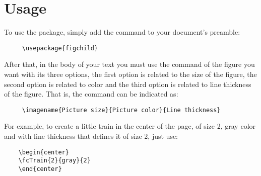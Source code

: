 \documentclass{article}
\begin{document}

\section{Usage}

\hspace{\parindent}To use the package, simply add the command to your document's preamble:

\begin{verbatim}
     \usepackage{figchild}
\end{verbatim}

After that, in the body of your text you must use the command of the figure you want with its three options, the first option is related to the size of the figure, the second option is related to color and the third option is related to line thickness of the figure. That is, the command can be indicated as:

\begin{verbatim}
     \imagename{Picture size}{Picture color}{Line thickness}
\end{verbatim}

For example, to create a little train in the center of the page, of size 2, gray color and with line thickness that defines it of size 2, just use:

\begin{verbatim}
    \begin{center}
    \fcTrain{2}{gray}{2}
    \end{center}
\end{verbatim}

\begin{center}
\end{center}

\end{document}
